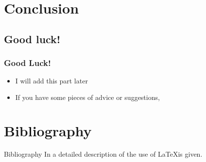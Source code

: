 \documentclass[light]{lutbeamer} %
\begin{document}


\section{Conclusion}
\subsection{Good luck!}

\begin{frame}
\frametitle{Good Luck!}
\begin{itemize}
\item I will add this part later
\item If you have some pieces of advice or suggestions,
\end{itemize}
\end{frame}


\appendix %



\section*{Bibliography}
\begin{frame}[fragile]{Bibliography}
In \cite{eu2020white} a detailed description of the use of \LaTeX is given.

\printbibliography
\end{frame}
\end{document}
